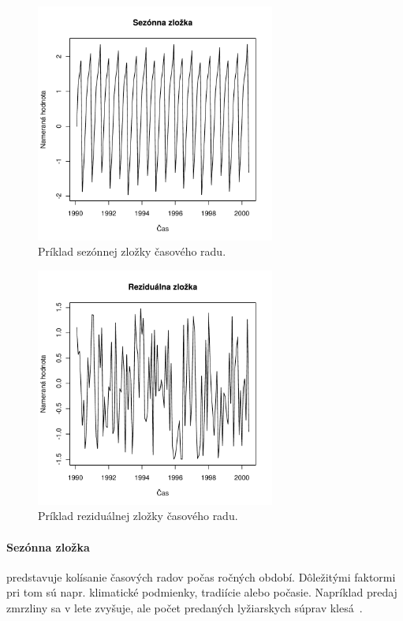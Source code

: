 \documentclass[a4paper,slovak,12pt,appendix]{article}
\begin{document}
\begin{figure}[H]
  \centering
  \includegraphics[width=0.7\textwidth]{season_component.pdf}
  \caption{Príklad sezónnej zložky časového radu.}
  \label{fig-season-comp}
\end{figure}

\begin{figure}[H]
  \centering
  \includegraphics[width=0.7\textwidth]{random_component.pdf}
  \caption{Príklad reziduálnej zložky časového radu.}
  \label{fig-random-comp}
\end{figure}

\paragraph{Sezónna zložka} predstavuje kolísanie časových radov počas ročných
období. Dôležitými faktormi pri tom sú napr. klimatické podmienky, tradiície
alebo počasie. Napríklad predaj zmrzliny sa v lete zvyšuje, ale počet
predaných lyžiarskych súprav klesá~\cite{Agrawal2013}.
\end{document}
